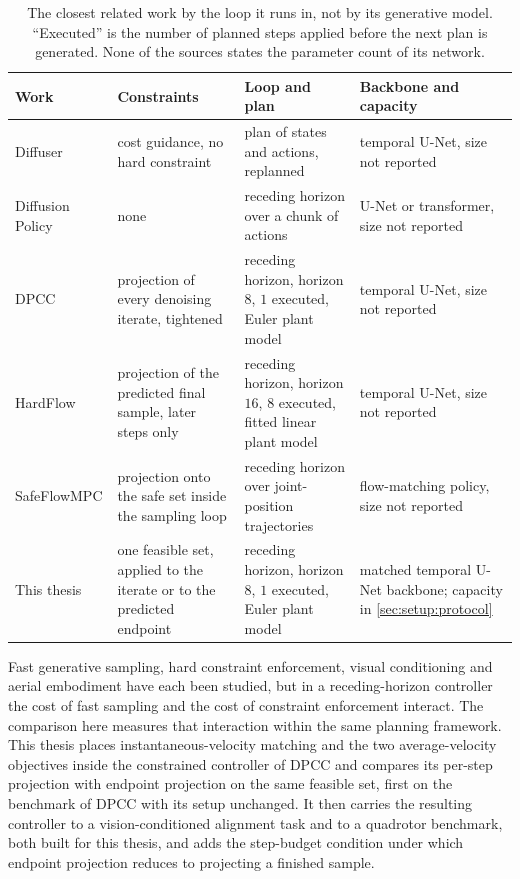 \documentclass[headsepline,footsepline,footinclude=false,oneside,fontsize=11pt,paper=a4,listof=totoc,bibliography=totoc]{scrbook}
\theoremstyle{definition}
\theoremstyle{plain}
\theoremstyle{remark}
\begin{document}
\begin{table}[htpb]
  \caption[Planner, loop and constraint mechanism in the closest related work]{The closest related
  work by the loop it runs in, not by its generative model. ``Executed'' is the number of planned
  steps applied before the next plan is generated. None of the sources states the parameter count of
  its network.}
  \label{tab:related-loops}
  \centering\small
  \begin{tabularx}{\linewidth}{lLLL}
    \toprule
    Work & Constraints & Loop and plan & Backbone and capacity \\
    \midrule
    Diffuser \parencite{janner2022planning}
      & cost guidance, no hard constraint
      & plan of states and actions, replanned
      & temporal U-Net, size not reported \\
    Diffusion Policy \parencite{chi2023diffusion}
      & none
      & receding horizon over a chunk of actions
      & U-Net or transformer, size not reported \\
    \ac{DPCC} \parencite{romer2025diffusion}
      & projection of every denoising iterate, tightened
      & receding horizon, horizon $8$, $1$ executed, Euler plant model
      & temporal U-Net, size not reported \\
    HardFlow \parencite{li2025hardflow}
      & projection of the predicted final sample, later steps only
      & receding horizon, horizon $16$, $8$ executed, fitted linear plant model
      & temporal U-Net, size not reported \\
    SafeFlowMPC \parencite{oelerich2026safeflowmpc}
      & projection onto the safe set inside the sampling loop
      & receding horizon over joint-position trajectories
      & flow-matching policy, size not reported \\
    This thesis
      & one feasible set, applied to the iterate or to the predicted endpoint
      & receding horizon, horizon $8$, $1$ executed, Euler plant model
      & matched temporal U-Net backbone; capacity in \autoref{sec:setup:protocol} \\
    \bottomrule
  \end{tabularx}
\end{table}

Fast generative sampling, hard constraint enforcement, visual conditioning and aerial embodiment have
each been studied, but in a receding-horizon controller the cost of fast sampling and the cost of
constraint enforcement interact. The comparison here measures that interaction within the same
planning framework.
This thesis places instantaneous-velocity matching and the two average-velocity objectives inside the
constrained controller
of \ac{DPCC} and compares its per-step projection with endpoint projection \parencite{li2025hardflow}
on the same feasible set, first on the benchmark of \ac{DPCC} with its setup unchanged. It then carries
the resulting controller to a vision-conditioned alignment task and to a quadrotor benchmark, both built
for this thesis, and adds the step-budget condition under which endpoint projection reduces to
projecting a finished sample.
\end{document}
